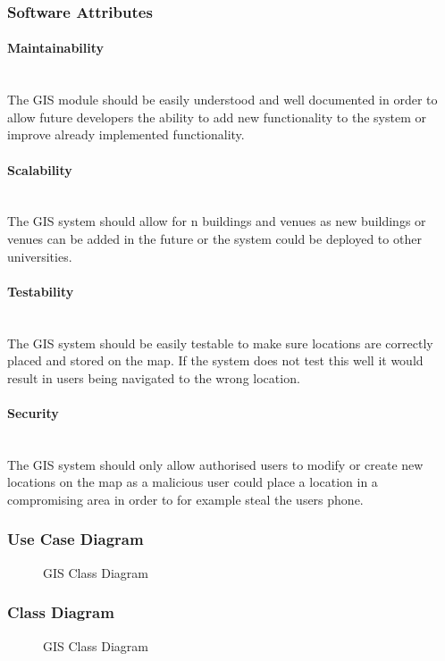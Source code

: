 \subsubsection{Software Attributes}

\paragraph{Maintainability}
\mbox{}\\
The GIS module should be easily understood and well documented in order to allow future developers the ability to add new functionality to the system or improve already implemented functionality.

\paragraph{Scalability}
\mbox{}\\
The GIS system should allow for n buildings and venues as new buildings or venues can be added in the future or the system could be deployed to other universities.

\paragraph{Testability}
\mbox{}\\
The GIS system should be easily testable to make sure locations are correctly placed and stored on the map. If the system does not test this well it would result in users being navigated to the wrong location.

\paragraph{Security}
\mbox{}\\
The GIS system should only allow authorised users to modify or create new locations on the map as a malicious user could place a location in a compromising area in order to for example steal the users phone.

\pagebreak
\subsubsection{Use Case Diagram}

	\begin{figure}[h!]
	\caption{GIS Class Diagram}
	\end{figure}
\pagebreak

\subsubsection{Class Diagram}
	\begin{figure}[h!]
	\caption{GIS Class Diagram}
	\end{figure}
